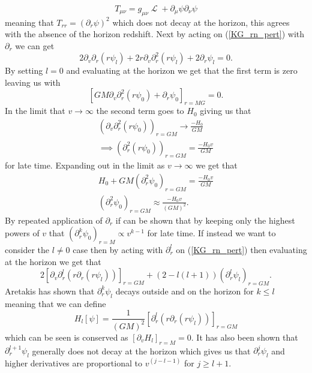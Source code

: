 \documentclass[12pt]{article}
\numberwithin{equation}{section}
\DeclareMathOperator{\Lagr}{\mathcal{L}}
\numberwithin{figure}{section}
\begin{document}
\begin{equation}
	T_{\mu\nu}=g_{\mu\nu}\Lagr+\partial_{\mu}\psi\partial_{\nu}\psi
\end{equation}
meaning that $T_{rr}=(\partial_{r}\psi)^{2}$ which does not decay at the horizon, this agrees with the absence of the horizon redshift. 
Next by acting on (\ref{KG_rn_pert}) with $\partial_r$ we can get
\begin{equation}
	2\partial_{v}\partial_{r}(r\psi_{l}) +2r\partial_{v}\partial_{r}^{2}(r\psi_{l}) +2\partial_{r}\psi_{l}=0.
\end{equation}
By setting $l=0$ and evaluating at the horizon we get that the first term is zero leaving us with
\begin{equation}
	\left[GM\partial_{v}\partial_{r}^{2}(r\psi_{0}) +\partial_{r}\psi_{0}\right]_{r=MG}=0.
\end{equation}
In the limit that $v\to\infty$ the second term goes to $H_{0}$ giving us that
\begin{align}
	(\partial_{v}\partial_{r}^{2}(r\psi_{0}))_{r=GM}\to \frac{-H_{0}}{GM}\\
	\implies (\partial_{r}^{2}(r\psi_{0}))_{r=GM} = \frac{-H_{0}v}{GM}
\end{align}
for late time. Expanding out in the limit as $v\to\infty$ we get that 
\begin{align}
	H_{0}+GM(\partial_{r}^{2}\psi_{0})_{r=GM}= \frac{-H_{0}v}{GM}\\
	(\partial_{r}^{2}\psi_{0})_{r=GM}\approx \frac{-H_{0}v}{(GM)^{2}}.
\end{align}
By repeated application of $\partial_{r}$ if can be shown that by keeping only the highest powers of $v$ that $(\partial_{r}^{k}\psi_{0})_{r=M}\propto v^{k-1}$ for late time.
If instead we want to consider the $l\ne 0$ case then by acting with $\partial_{r}^{l}$ on (\ref{KG_rn_pert}) then evaluating at the horizon we get that
\begin{equation}
	2[\partial_{v}\partial_{r}^{l}(r\partial_{r}(r\psi_{l}))]_{r=GM}+(2-l(l+1))(\partial_{r}^{l}\psi_{l})_{r=GM}.
\end{equation}
Aretakis has shown that $\partial_{r}^{k}\psi_{l}$ decays outside and on the horizon for $k\le l$ meaning that we can define 
\begin{equation}
	H_{l}[\psi]=\frac{1}{(GM)^{2}}[\partial_{r}^{l}(r\partial_{r}(r\psi_{l}))]_{r=GM}
\end{equation}
which can be seen is conserved as $[\partial_{v}H_{l}]_{r=M}=0$. It has also been shown that $\partial_{r}^{l+1}\psi_{l}$ generally does not decay at the horizon which gives us that $\partial_{r}^{j}\psi_{l}$ and higher derivatives are proportional to $v^{(j-l-1) }$ for $j\ge l+1$. 
\end{document}
